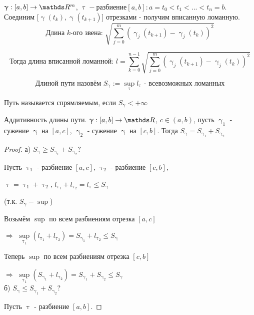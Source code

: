 \documentclass[12pt, fleqn]{article}
\begin{document}
\begin{Property}[3]
\begin{Property}[4]
\begin{Property}[2, аддитивность]
\begin{Proof}
\begin{definition} 
    $\upgamma: [a,b] \rightarrow \R^m$, $\uptau - разбиение [a,b]: a=t_0<t_1<...<t_n=b$. Соединим $[\upgamma(t_k), \upgamma(t_{k+1})$] отрезками - получим вписанную ломанную. 
    $$\text{Длина $k$-ого звена: }\sqrt{\sum\limits_{j=0}^m (\upgamma_j(t_{k+1}) - \upgamma_j(t_k))^2}$$ 
    
    $$\text{Тогда длина вписанной ломанной: }l=\sum\limits_{k=0}^{n-1} \sqrt{\sum\limits_{j=0}^m (\upgamma_j(t_{k+1}) - \upgamma_j(t_k))^2}$$
    
    $$\text{Длиной пути назовём } S_\upgamma := \sup\limits_{\uptau} l_\uptau\text{ - всевозможных ломанных}$$
\end{definition}

\begin{definition}
    Путь называется спрямляемым, если $S_\upgamma < +\infty$
\end{definition}

\begin{utv}
    Аддитивность длины пути. $\upgamma: [a,b] \rightarrow \R$, $c \in (a,b)$, пусть $\upgamma_1$ - сужение $\upgamma$ на $[a,c]$, $\upgamma_2$ - сужение $\upgamma$ на $[c,b]$. Тогда $S_\upgamma = S_{\upgamma_1} + S_{\upgamma_2}$
\end{utv}

\begin{proof}
    а) $S_\upgamma \geqslant S_{\upgamma_1} + S_{\upgamma_2} ?$
    
    Пусть $\uptau_1$ - разбиение $[a,c]$, $\uptau_2$ - разбиение $[c,b]$, 
    
    $\uptau = \uptau_1 + \uptau_2$, $l_{\uptau_1} + l_{\uptau_2} = l_\uptau \leqslant S_\upgamma$ 
    
    (т.к. $S_\upgamma - \sup$)
    
    Возьмём $\sup$ по всем разбиениям отрезка $[a,c]$ 
    
    $\Rightarrow$ $\sup\limits_{\uptau_1} (l_{\uptau_1} + l_{\uptau_2}) = S_{\upgamma_1} + l_{\uptau_2} \leqslant S_\upgamma$
    
    Теперь $\sup$ по всем разбиениям отрезка $[c,b]$ 
    
    $\Rightarrow$ $\sup\limits_{\uptau_1} (S_{\upgamma_1} + l_{\uptau_2}) = S_{\upgamma_1} + S_{\upgamma_2} \leqslant S_\upgamma$
    \\
    б) $S_\upgamma \leqslant S_{\upgamma_1} + S_{\upgamma_2} ?$
    
    Пусть $\uptau$ - разбиение $[a,b]$. 
    

\end{proof}
\end{Proof}
\end{Property}
\end{Property}
\end{Property}
\end{document}
